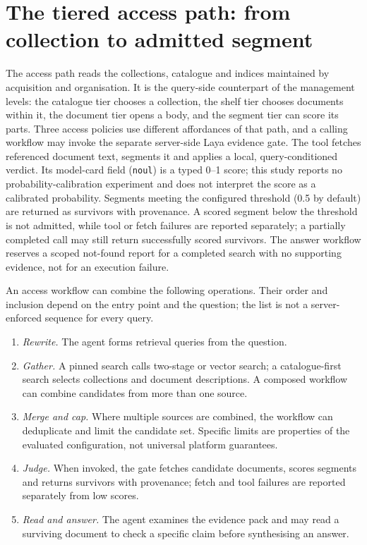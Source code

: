 \section{The tiered access path: from collection to admitted segment}
\label{sec:retrieval}
\label{sec:lanes}

The access path reads the collections, catalogue and indices maintained by
acquisition and organisation. It is the query-side counterpart of the
management levels: the catalogue tier chooses a collection, the shelf tier
chooses documents within it, the document tier opens a body, and the segment
tier can score its parts. Three access policies use different affordances of that
path, and a calling workflow may invoke the separate server-side Laya evidence
gate. The tool fetches referenced document text, segments it and applies a
local, query-conditioned verdict. Its model-card field (\texttt{noul}) is a
typed 0--1 score; this study reports no probability-calibration experiment and
does not interpret the score as a calibrated probability. Segments meeting the
configured threshold (0.5 by default) are returned as survivors with
provenance. A scored segment below the threshold is not admitted, while tool
or fetch failures are reported separately; a partially completed call may
still return successfully scored survivors. The answer workflow reserves a
scoped not-found report for a completed search with no supporting evidence,
not for an execution failure.

An access workflow can combine the following operations. Their order and
inclusion depend on the entry point and the question; the list is not a
server-enforced sequence for every query.
\begin{enumerate}
\item \emph{Rewrite.} The agent forms retrieval queries from the question.
\item \emph{Gather.} A pinned search calls two-stage or vector search; a
catalogue-first search selects collections and document descriptions. A
composed workflow can combine candidates from more than one source.
\item \emph{Merge and cap.} Where multiple sources are combined, the workflow
can deduplicate and limit the candidate set. Specific limits are properties of
the evaluated configuration, not universal platform guarantees.
\item \emph{Judge.} When invoked, the gate fetches candidate documents, scores
segments and returns survivors with provenance; fetch and tool failures are
reported separately from low scores.
\item \emph{Read and answer.} The agent examines the evidence pack and may read
a surviving document to check a specific claim before synthesising an answer.
\end{enumerate}

